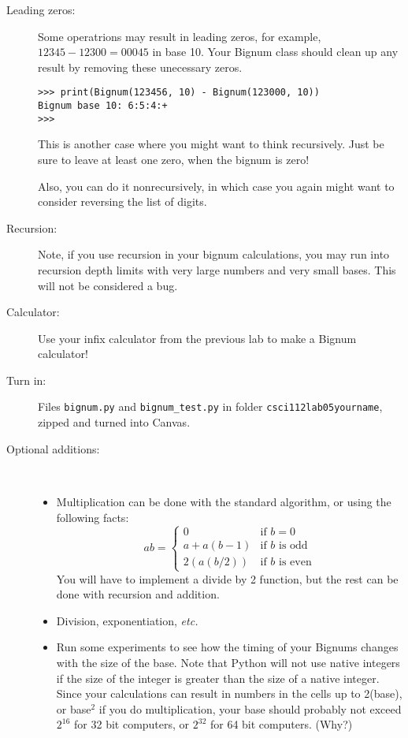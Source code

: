 \documentclass{article}
\begin{document}
\begin{description}
\item[Leading zeros:]  Some operatrions may result in leading zeros, for example,
$12345 - 12300 = 00045$ in base 10.  Your Bignum class should clean up any result
by removing these unecessary zeros.

\begin{lstlisting}
>>> print(Bignum(123456, 10) - Bignum(123000, 10))
Bignum base 10: 6:5:4:+
>>> 
\end{lstlisting}

This is another case where you might want to think recursively.
Just be sure to leave at least one zero, when the bignum is zero!

Also, you can do it nonrecursively, in which case you again
might want to consider reversing the list of digits.


\item[Recursion:]  Note, if you use recursion in your bignum calculations,
you may run into recursion depth limits with very large numbers and very
small bases.
This will not be considered a bug.

\item[Calculator:] Use your infix calculator from the previous lab to
make a Bignum calculator!

\item[Turn in:] Files {\tt bignum.py} and {\tt bignum\_test.py} in folder
{\tt csci112lab05yourname}, zipped and turned into Canvas.

\item[Optional additions:] ~

\begin{itemize}
\item
Multiplication can be done with the standard algorithm, or using the following facts:
\[
ab = 
\left\{\begin{array}{ll}
0 & \mbox{if $b=0$} \\
a+a(b-1) & \mbox{if $b$ is odd} \\
2(a(b/2)) & \mbox{if $b$ is even}
\end{array}\right.
\]
You will have to implement a divide by 2 function, but the rest can be done
with recursion and addition.

\item Division, exponentiation, {\em etc.}

\item Run some experiments to see how the timing of your
Bignums changes with the size of the base.  Note that Python will
not use native integers if the size of the integer is greater 
than the size of a native integer.  Since your calculations can result
in numbers in the cells up to 2(base), or base$^2$ if you do multiplication, 
your base should probably
not exceed $2^{16}$ for 32 bit computers, or $2^{32}$ for 64 bit
computers.  (Why?)


\end{itemize}
\end{description}
\end{document}
